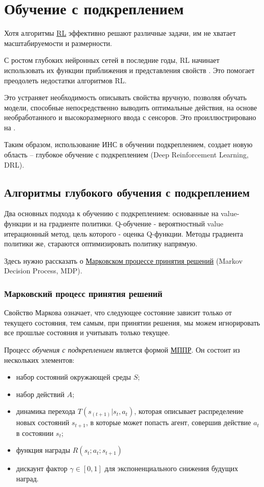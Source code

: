\section{Обучение с подкреплением} \label{ch1:rl}

Хотя алгоритмы \hyperref[acr:rl]{RL} эффективно решают различные задачи, им не хватает масштабируемости и размерности.

С ростом глубоких нейронных сетей в последние годы, RL начинает использовать их функции приближения и представления свойств \cite{HORNIK1991251}. Это помогает преодолеть недостатки алгоритмов RL.

Это устраняет необходимость описывать свойства вручную, позволяя обучать модели, способные непосредственно выводить оптимальные действия, на основе необработанного и высокоразмерного ввода с сенсоров. Это проиллюстрировано на .

Таким образом, использование ИНС в обучении подкреплением, создает новую область – глубокое обучение с подкреплением (Deep Reinforcement Learning, DRL).


\subsection{Алгоритмы глубокого обучения с подкреплением}

Два основных подхода к обучению с подкреплением: основанные на value-функции и на градиенте политики. Q-обучение - вероятностный value итерационный метод, цель которого - оценка Q-функции. Методы градиента политики же, стараются оптимизировать политику напрямую.

Здесь нужно рассказать о \hyperref[acr:mdp]{Марковском процессе принятия решений} (Markov Decision Process, MDP).

\subsubsection{Марковский процесс принятия решений}

Свойство Маркова означает, что следующее состояние зависит только от текущего состояния, тем самым, при принятии решения, мы можем игнорировать все прошлые состояния и учитывать только текущее.

Процесс {\itshape обучения с подкреплением} является формой \hyperref[acr:mdp]{МППР}. Он состоит из нескольких элементов:

\begin{itemize}
	\item набор состояний окружающей среды $S$;
	\item набор действий $A$;
	\item динамика перехода $T(s_{(t+1)}|s_t, a_t)$, которая описывает распределение новых состояний $s_{t+1}$, в которые может попасть агент, совершив действие $a_t$ в состоянии $s_t$;
	\item функция награды $R(s_t; a_t; s_{t+1})$
	\item дискаунт фактор $\gamma \in [0, 1]$ для экспоненциального снижения будущих наград.
\end{itemize}

